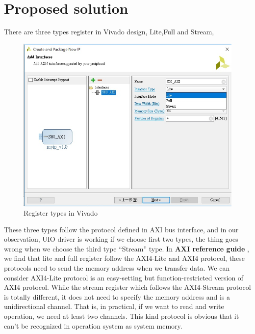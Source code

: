 
\chapter{Proposed solution }
\label{cha:proposed solution }
There are three types register in Vivado design, Lite,Full and Stream, 

\begin{figure}[!htb]
  \centering
  \includegraphics[scale=0.7]{images/register_type.jpg}
  \caption[Register types in Vivado]{Register types in Vivado}
  \label{fig:Register types in Vivado}
\end{figure}

These three types follow the protocol defined in AXI bus interface, and in our observation, UIO driver is working if we choose first two types, the thing goes wrong when we choose the third type ``Stream'' type. In \textbf{AXI reference guide} \cite{axiref}, we find that lite and full register follow the AXI4-Lite and AXI4 protocol, these protocols need to send the memory address when we transfer data. We can consider AXI4-Lite protocol is an easy-setting but function-restricted version of AXI4 protocol. While the stream register which follows the AXI4-Stream protocol is totally different, it does not need to specify the memory address and is a unidirectional channel. That is, in practical, if we want to read and write operation, we need at least two channels. This kind protocol is obvious that it can't be recognized in operation system as system memory.

